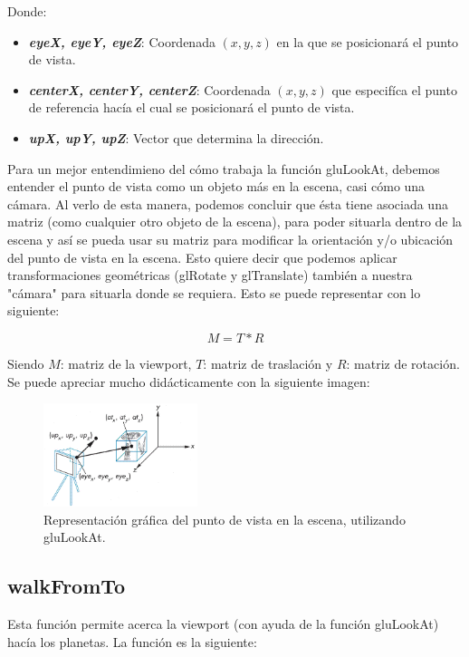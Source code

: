 \documentclass[journal]{IEEEtran}
\begin{document}


Donde:

\begin{itemize}
	\item \textbf{\textit{eyeX, eyeY, eyeZ}}: Coordenada $(x,y,z)$ en la que se posicionará el punto de vista.
	\item \textbf{\textit{centerX, centerY, centerZ}}: Coordenada $(x,y,z)$ que especifíca el punto de referencia hacía el cual se posicionará el punto de vista.
	\item \textbf{\textit{upX, upY, upZ}}: Vector que determina la dirección.
\end{itemize}
                
Para un mejor entendimieno del cómo trabaja la función gluLookAt, debemos entender el punto de vista como un objeto más en la escena, casi cómo una cámara. Al verlo de esta manera, podemos concluir que ésta tiene asociada una matriz (como cualquier otro objeto de la escena), para poder situarla dentro de la escena y así se pueda usar su matriz para modificar la orientación y/o ubicación del punto de vista en la escena. Esto quiere decir que podemos aplicar transformaciones geométricas (glRotate y glTranslate) también a nuestra "cámara" para situarla donde se requiera. Esto se puede representar con lo siguiente:

\[
	M = T * R
\]

Siendo $M$: matriz de la viewport, $T$: matriz de traslación y $R$: matriz de rotación. Se puede apreciar mucho didácticamente con la siguiente imagen:

\begin{figure}[h!]
	\includegraphics[width=0.4\textwidth, height=0.25\textwidth]{viewport.png}
	\centering
	\caption{Representación gráfica del punto de vista en la escena, utilizando gluLookAt.}
\end{figure}

\subsection{walkFromTo}

Esta función permite acerca la viewport (con ayuda de la función gluLookAt) hacía los planetas. La función es la siguiente:
\end{document}
